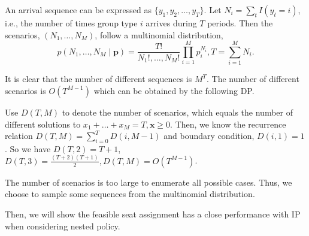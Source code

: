 An arrival sequence can be expressed as $\{y_{1}, y_{2}, \ldots, y_{T}\}$. Let $N_{i} = \sum_{t} I(y_t = i)$, i.e., the number of times group type $i$ arrives during $T$ periods. Then the scenarios, $(N_1, \ldots, N_{M})$, follow a multinomial distribution, $$p\left(N_1, \ldots, N_{M} \mid \mathbf{p}\right)=\frac{T !}{N_{1}!, \ldots, N_{M}!} \prod_{i=1}^{M} p_{i}^{N_i}, T = \sum_{i=1}^{M} N_{i}.$$

It is clear that the number of different sequences is $M^{T}$. The number of different scenarios is $O(T^{M-1})$ which can be obtained by the following DP.

Use $D(T, M) $ to denote the number of scenarios, which equals the number of different solutions to $x_{1}+\ldots + x_{M} = T, \mathbf{x} \geq 0$. Then, we know the recurrence relation $D(T, M) = \sum_{i= 0}^{T} D(i, M-1)$ and boundary condition, $D(i,1) = 1$. So we have $D(T,2) = T+1$, $D(T,3) = \frac{(T+2)(T+1)}{2}, D(T,M) = O(T^{M-1})$. 

The number of scenarios is too large to enumerate all possible cases. Thus, we choose to sample some sequences from the multinomial distribution.

Then, we will show the feasible seat assignment has a close performance with IP when considering nested policy.


